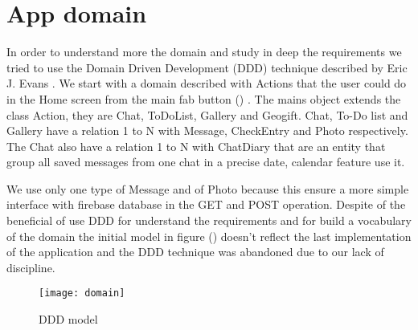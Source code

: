 
\section{App domain}
\label{sec:app-domain}

In order to understand more the domain and study in deep the requirements we tried to use the Domain Driven Development (DDD) technique described by Eric J. Evans \cite{DDD_Eric}. We start with a domain described with Actions that the user could do in the Home screen from the main fab button () .
The mains object extends the class Action, they are Chat, ToDoList, Gallery and Geogift. Chat, To-Do list and Gallery have a relation 1 to N with Message, CheckEntry and Photo respectively. The Chat also have a relation 1 to N with ChatDiary that are an entity that group all saved messages from one chat in a precise date, calendar feature use it. 

We use only one type of Message and of Photo because this ensure a more simple interface with firebase database in the GET and POST operation. Despite of the beneficial of use DDD for understand the requirements and for build a vocabulary of the domain the initial model in figure () doesn't reflect the last implementation of the application and the DDD technique was abandoned due to our lack of discipline.

\begin{figure}[hb]
	\texttt{[image: domain]}
	\caption{DDD model}
	\label{fig:DDD_model}
\end{figure}